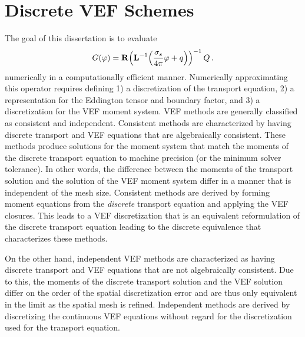 \documentclass[../doc.tex]{subfiles}
\begin{document}
\section{Discrete VEF Schemes}
The goal of this dissertation is to evaluate 
	\begin{equation}
		G(\varphi) = \boldsymbol{\mathrm{R}}\!\left( \boldsymbol{\mathrm{L}}^{-1}\!\left( \frac{\sigma_s}{4\pi}\varphi + q \right) \right)^{-1} Q \,. 
	\end{equation}
numerically in a computationally efficient manner. Numerically approximating this operator requires defining 1) a discretization of the transport equation, 2) a representation for the Eddington tensor and boundary factor, and 3) a discretization for the VEF moment system. VEF methods are generally classified as consistent and independent. Consistent methods are characterized by having discrete transport and VEF equations that are algebraically consistent. These methods produce solutions for the moment system that match the moments of the discrete transport equation to machine precision (or the minimum solver tolerance). In other words, the difference between the moments of the transport solution and the solution of the VEF moment system differ in a manner that is independent of the mesh size. Consistent methods are derived by forming moment equations from the \emph{discrete} transport equation and applying the VEF closures. This leads to a VEF discretization that is an equivalent reformulation of the discrete transport equation leading to the discrete equivalence that characterizes these methods. 

On the other hand, independent VEF methods are characterized as having discrete transport and VEF equations that are not algebraically consistent. Due to this, the moments of the discrete transport solution and the VEF solution differ on the order of the spatial discretization error and are thus only equivalent in the limit as the spatial mesh is refined. Independent methods are derived by discretizing the continuous VEF equations without regard for the discretization used for the transport equation. 
\end{document}
